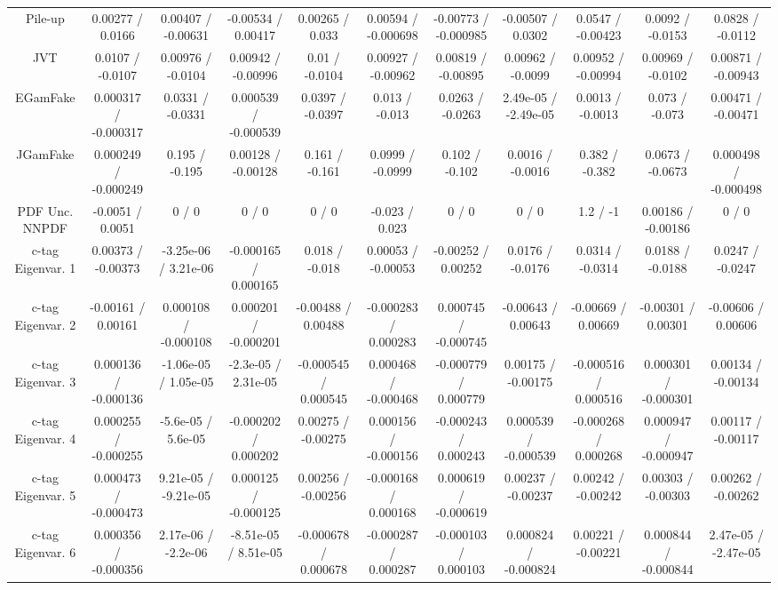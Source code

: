 \begin{table}[htbp]
\begin{center}
\begin{tabular}{|c|c|c|c|c|c|c|c|c|c|c|}
  Pile-up & 0.00277 / 0.0166 & 0.00407 / -0.00631 & -0.00534 / 0.00417 & 0.00265 / 0.033 & 0.00594 / -0.000698 & -0.00773 / -0.000985 & -0.00507 / 0.0302 & 0.0547 / -0.00423 & 0.0092 / -0.0153 & 0.0828 / -0.0112 \\ 
  JVT & 0.0107 / -0.0107 & 0.00976 / -0.0104 & 0.00942 / -0.00996 & 0.01 / -0.0104 & 0.00927 / -0.00962 & 0.00819 / -0.00895 & 0.00962 / -0.0099 & 0.00952 / -0.00994 & 0.00969 / -0.0102 & 0.00871 / -0.00943 \\ 
  EGamFake & 0.000317 / -0.000317 & 0.0331 / -0.0331 & 0.000539 / -0.000539 & 0.0397 / -0.0397 & 0.013 / -0.013 & 0.0263 / -0.0263 & 2.49e-05 / -2.49e-05 & 0.0013 / -0.0013 & 0.073 / -0.073 & 0.00471 / -0.00471 \\ 
  JGamFake & 0.000249 / -0.000249 & 0.195 / -0.195 & 0.00128 / -0.00128 & 0.161 / -0.161 & 0.0999 / -0.0999 & 0.102 / -0.102 & 0.0016 / -0.0016 & 0.382 / -0.382 & 0.0673 / -0.0673 & 0.000498 / -0.000498 \\ 
  PDF Unc. NNPDF & -0.0051 / 0.0051 & 0 / 0 & 0 / 0 & 0 / 0 & -0.023 / 0.023 & 0 / 0 & 0 / 0 & 1.2 / -1 & 0.00186 / -0.00186 & 0 / 0 \\ 
  c-tag Eigenvar. 1 & 0.00373 / -0.00373 & -3.25e-06 / 3.21e-06 & -0.000165 / 0.000165 & 0.018 / -0.018 & 0.00053 / -0.00053 & -0.00252 / 0.00252 & 0.0176 / -0.0176 & 0.0314 / -0.0314 & 0.0188 / -0.0188 & 0.0247 / -0.0247 \\ 
  c-tag Eigenvar. 2 & -0.00161 / 0.00161 & 0.000108 / -0.000108 & 0.000201 / -0.000201 & -0.00488 / 0.00488 & -0.000283 / 0.000283 & 0.000745 / -0.000745 & -0.00643 / 0.00643 & -0.00669 / 0.00669 & -0.00301 / 0.00301 & -0.00606 / 0.00606 \\ 
  c-tag Eigenvar. 3 & 0.000136 / -0.000136 & -1.06e-05 / 1.05e-05 & -2.3e-05 / 2.31e-05 & -0.000545 / 0.000545 & 0.000468 / -0.000468 & -0.000779 / 0.000779 & 0.00175 / -0.00175 & -0.000516 / 0.000516 & 0.000301 / -0.000301 & 0.00134 / -0.00134 \\ 
  c-tag Eigenvar. 4 & 0.000255 / -0.000255 & -5.6e-05 / 5.6e-05 & -0.000202 / 0.000202 & 0.00275 / -0.00275 & 0.000156 / -0.000156 & -0.000243 / 0.000243 & 0.000539 / -0.000539 & -0.000268 / 0.000268 & 0.000947 / -0.000947 & 0.00117 / -0.00117 \\ 
  c-tag Eigenvar. 5 & 0.000473 / -0.000473 & 9.21e-05 / -9.21e-05 & 0.000125 / -0.000125 & 0.00256 / -0.00256 & -0.000168 / 0.000168 & 0.000619 / -0.000619 & 0.00237 / -0.00237 & 0.00242 / -0.00242 & 0.00303 / -0.00303 & 0.00262 / -0.00262 \\ 
  c-tag Eigenvar. 6 & 0.000356 / -0.000356 & 2.17e-06 / -2.2e-06 & -8.51e-05 / 8.51e-05 & -0.000678 / 0.000678 & -0.000287 / 0.000287 & -0.000103 / 0.000103 & 0.000824 / -0.000824 & 0.00221 / -0.00221 & 0.000844 / -0.000844 & 2.47e-05 / -2.47e-05 \\ 

\end{tabular}
\end{center}
\end{table}
